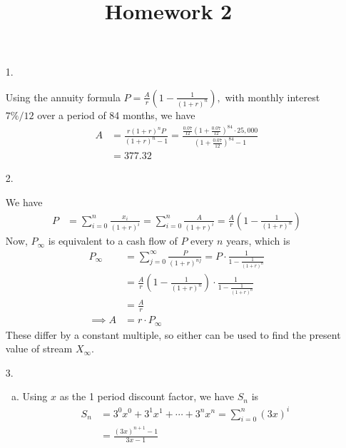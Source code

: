 \documentclass{article}
\begin{document}
\title{Homework 2}
\maketitle
\thispagestyle{fancy}

\begin{enumerate}
	\item[1.]
		\begin{soln}
			Using the annuity formula $P=\frac{A}{r}\left( 1-\frac{1}{(1+r)^n} \right),$ with monthly interest $7\%/12$ over a period of 84 months, we have
			\begin{align*}
				A &= \frac{r(1+r)^n P}{(1+r)^n-1} = \frac{\frac{0.07}{12}\left( 1+\frac{0.07}{12} \right)^{84}\cdot 25, 000}{\left( 1+\frac{0.07}{12} \right)^{84}-1} \\
				&= 377.32
			\end{align*}
		\end{soln}

	\item[2.]
		\begin{soln}
			We have
			\begin{align*}
				P &= \sum_{i=0}^{n} \frac{x_i}{(1+r)^i} = \sum_{i=0}^{n} \frac{A}{(1+r)^i} = \frac{A}{r}\left( 1-\frac{1}{(1+r)^n} \right)
			\end{align*}
			Now, $P_{\infty}$ is equivalent to a cash flow of $P$ every $n$ years, which is
			\begin{align*}
				P_\infty &= \sum_{j=0}^{\infty} \frac{P}{(1+r)^{nj}} = P\cdot \frac{1}{1-\frac{1}{(1+r)^n}} \\
				&= \frac{A}{r}\left( 1-\frac{1}{(1+r)^n} \right)\cdot \frac{1}{1-\frac{1}{(1+r)^n}} \\
				&= \frac{A}{r} \\
				\implies A &= r\cdot P_\infty
			\end{align*}
			These differ by a constant multiple, so either can be used to find the present value of stream $X_\infty.$
		\end{soln}

	\item[3.] 
		\begin{enumerate}[(a)]
			\item 
				\begin{soln}
					Using $x$ as the 1 period discount factor, we have $S_n$ is
					\begin{align*}
						S_n &= 3^0x^0 + 3^1x^1+\cdots+3^nx^n = \sum_{i=0}^{n} (3x)^i \\
						&= \frac{(3x)^{n+1}-1}{3x-1}
					\end{align*}
				\end{soln}


\end{enumerate}
\end{enumerate}
\end{document}
